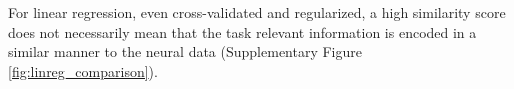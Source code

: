 \documentclass{article} %
\begin{document}
For linear regression, even cross-validated and regularized, a high similarity score does not necessarily mean that the task relevant information is encoded in a similar manner to the neural data (Supplementary Figure \ref{fig:linreg_comparison}).








\end{document}
